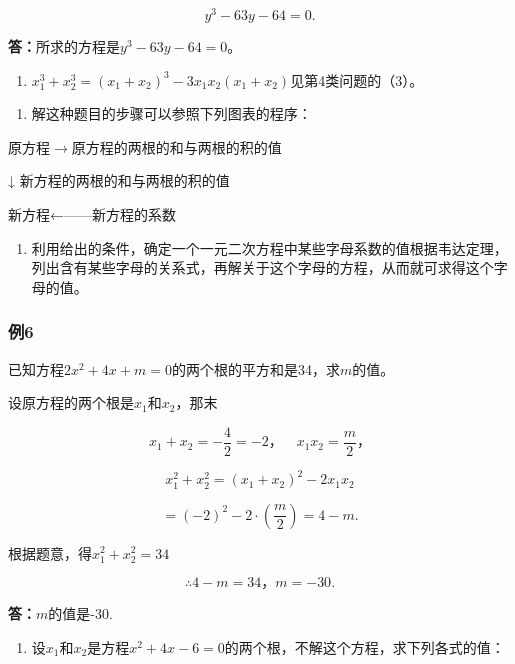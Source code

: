 \[
y ^ {3} - 63 y - 64 = 0.
\]

\textbf{答：}所求的方程是\(y^{3}-63y-64=0\)。

\begin{enumerate}[start=1]
\item
  \(x_{1}^{3} + x_{2}^{3} = (x_{1} + x_{2})^{3} - 3x_{1}x_{2}(x_{1} + x_{2})\)见第4类问题的（3）。
\end{enumerate}

\begin{enumerate}[start=2]
\item
  解这种题目的步骤可以参照下列图表的程序：
\end{enumerate}

原方程\(\longrightarrow\)原方程的两根的和与两根的积的值

↓ 新方程的两根的和与两根的积的值

新方程←------新方程的系数

\begin{enumerate}[start=6]
\item
  利用给出的条件，确定一个一元二次方程中某些字母系数的值根据韦达定理，列出含有某些字母的关系式，再解关于这个字母的方程，从而就可求得这个字母的值。
\end{enumerate}

\subsubsection{例6}

已知方程\(2x^{2} + 4x + m = 0\)的两个根的平方和是34，求\(m\)的值。

 设原方程的两个根是\(x_{1}\)和\(x_{2}\)，那末

\[
x _ {1} + x _ {2} = - \frac{4}{2} = - 2\text{，} \quad x _ {1} x _ {2} = \frac{m}{2}\text{，}
\]

\[
x _ {1} ^ {2} + x _ {2} ^ {2} = \left(x _ {1} + x _ {2}\right) ^ {2} - 2 x _ {1} x _ {2}
\]

\[
= (- 2) ^ {2} - 2 \cdot \left(\frac{m}{2}\right) = 4 - m.
\]

根据题意，得\(x_{1}^{2} + x_{2}^{2} = 34\)

\[
\therefore 4 - m = 34\text{，} m = - 30.
\]

\textbf{答：}\(m\)的值是-30.

\begin{enumerate}
\item
  设\(x_{1}\)和\(x_{2}\)是方程\(x^{2} + 4x - 6 = 0\)的两个根，不解这个方程，求下列各式的值：
\end{enumerate}

